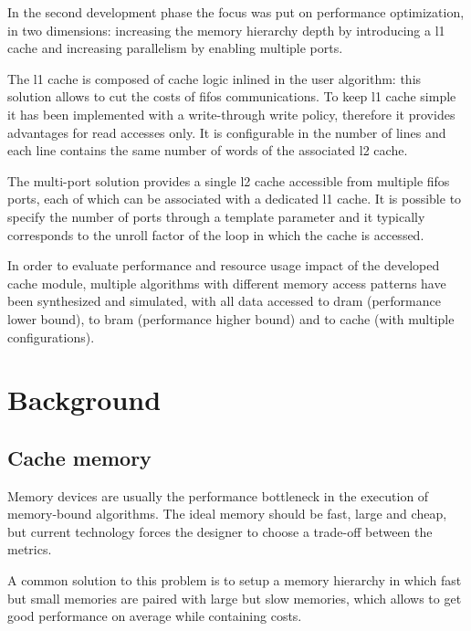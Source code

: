 \documentclass[11pt,a4paper,oneside]{memoir}
\begin{document}
\bigskip
In the second development phase the focus was put on performance optimization,
in two dimensions: increasing the memory hierarchy depth by introducing a
\ac{l1} cache and increasing parallelism by enabling multiple ports.

The \ac{l1} cache is composed of cache logic inlined in the user algorithm: this
solution allows to cut the costs of \acp{fifo} communications. To keep \ac{l1}
cache simple it has been implemented with a write-through write policy,
therefore it provides advantages for read accesses only. It is configurable in
the number of lines and each line contains the same number of words of the
associated \ac{l2} cache.

The multi-port solution provides a single \ac{l2} cache accessible from multiple
\acp{fifo} ports, each of which can be associated with a dedicated \ac{l1}
cache.
It is possible to specify the number of ports through a template parameter and
it typically corresponds to the unroll factor of the loop in which the cache
is accessed.

\bigskip
In order to evaluate performance and resource usage impact of the developed
cache module, multiple algorithms with different memory access patterns have
been synthesized and simulated, with all data accessed to \ac{dram} (performance
lower bound), to \ac{bram} (performance higher bound) and to cache (with
multiple configurations).

\vfill
\pagebreak

\tableofcontents*
\vfill
\pagebreak

\listoffigures*
\vfill
\pagebreak

\listoftables*
\vfill
\pagebreak

\printacronyms[heading=chapter*,name={List of Acronyms}]
\vfill
\pagebreak

\mainmatter
\chapter{Background}
\section{Cache memory}
Memory devices are usually the performance bottleneck in the execution of
memory-bound algorithms.
The ideal memory should be fast, large and cheap, but current technology forces
the designer to choose a trade-off between the metrics.

A common solution to this problem is to setup a memory hierarchy in
which fast but small memories are paired with large but slow memories, which
allows to get good performance on average while containing costs.
\end{document}
